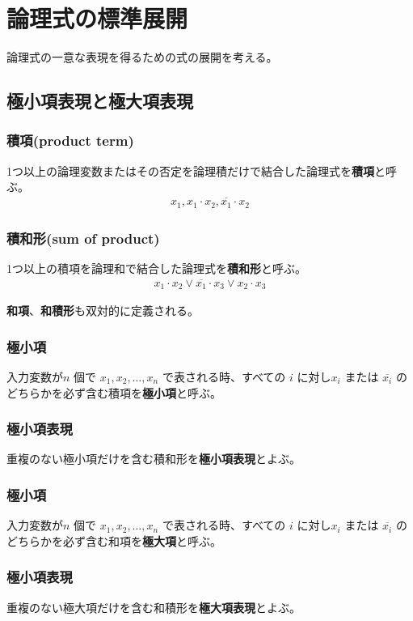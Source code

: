 \documentclass[a4j,10pt,oneside,openany,fleqn]{jsbook}
\begin{document}
\section{論理式の標準展開}
論理式の一意な表現を得るための式の展開を考える。
\subsection{極小項表現と極大項表現}

\subsubsection{積項(product term)}
1つ以上の論理変数またはその否定を論理積だけで結合した論理式を\textbf{積項}と呼ぶ。
\begin{align*}
x_1, x_1 \cdot x_2, \overline{x_1} \cdot x_2
\end{align*}
\subsubsection{積和形(sum of product)}
1つ以上の積項を論理和で結合した論理式を\textbf{積和形}と呼ぶ。
\begin{align*}
x_1 \cdot x_2 \vee \overline{x_1} \cdot x_3 \vee x_2 \cdot x_3
\end{align*}

\textbf{和項}、\textbf{和積形}も双対的に定義される。

\subsubsection{極小項}
入力変数が$n$ 個で $x_1, x_2, \dots, x_n$ で表される時、すべての $i$ に対し$x_i$ または $\overline{x_i}$ のどちらかを必ず含む積項を\textbf{極小項}と呼ぶ。

\subsubsection{極小項表現}
重複のない極小項だけを含む積和形を\textbf{極小項表現}とよぶ。


\subsubsection{極小項}
入力変数が$n$ 個で $x_1, x_2, \dots, x_n$ で表される時、すべての $i$ に対し$x_i$ または $\overline{x_i}$ のどちらかを必ず含む和項を\textbf{極大項}と呼ぶ。

\subsubsection{極小項表現}
重複のない極大項だけを含む和積形を\textbf{極大項表現}とよぶ。
\end{document}
